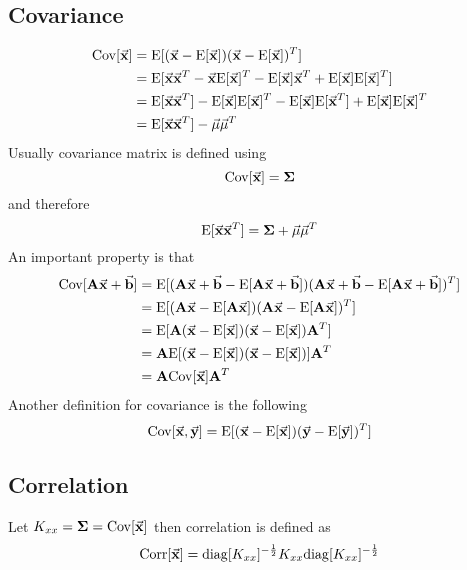\documentclass[../../main.tex]{subfiles}
\begin{document}
\subsection{Covariance}
\begin{align*}
    \cov{\vec{x}} &= \e{ (\vec{x}-\e{\vec{x}}) (\vec{x}-\e{\vec{x}})^T }\\
    &= \e{ \vec{x}\vec{x}^T - \vec{x}\e{\vec{x}}^T - \e{\vec{x}}\vec{x}^T + \e{\vec{x}}\e{\vec{x}}^T }\\
    &= \e{ \vec{x}\vec{x}^T }
        - \e{\vec{x}}\e{\vec{x}}^T
        - \e{\vec{x}}\e{\vec{x}^T}
        + \e{\vec{x}}\e{\vec{x}}^T\\
    &= \e{ \vec{x}\vec{x}^T } - \vec{\mu}\vec{\mu}^T
\end{align*}
Usually covariance matrix is defined using 
$$\cov{\vec{x}} = \mat{\Sigma}$$ 
and therefore
$$\e{\vec{x}\vec{x}^T}=\mat{\Sigma}+\vec{\mu}\vec{\mu}^T$$
An important property is that
\begin{align*}
    \cov{\mat{A}\vec{x}+\vec{b}} 
    &= \e{ (\mat{A}\vec{x}+\vec{b}-\e{\mat{A}\vec{x}+\vec{b}})
        (\mat{A}\vec{x}+\vec{b}-\e{\mat{A}\vec{x}+\vec{b}})^T }\\
    &= \e{ (\mat{A}\vec{x}-\e{\mat{A}\vec{x}})
        (\mat{A}\vec{x}-\e{\mat{A}\vec{x}})^T }\\
    &= \e{ \mat{A}(\vec{x}-\e{\vec{x}})
        (\vec{x}-\e{\vec{x}})\mat{A}^T }\\
    &= \mat{A}\e{ (\vec{x}-\e{\vec{x}})
        (\vec{x}-\e{\vec{x}}) }\mat{A}^T\\
    &= \mat{A}\cov{\vec{x}}\mat{A}^T\\
\end{align*}
Another definition for covariance is the following
\begin{equation*}
    \covv{\vec{x}}{\vec{y}} = \e{ (\vec{x}-\e{\vec{x}}) (\vec{y}-\e{\vec{y}})^T }\\
\end{equation*}

\subsection{Correlation}
Let $K_{xx}=\mat{\Sigma}=\cov{\vec{x}}$ then correlation is defined as
\begin{equation*}
    \corr{\vec{x}} = \diag{K_{xx}}^{-\frac{1}{2}} K_{xx} \diag{K_{xx}}^{-\frac{1}{2}}
\end{equation*}
\end{document}
